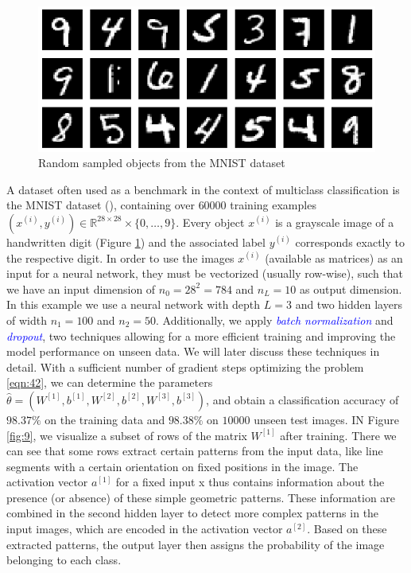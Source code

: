 \begin{figure}[h!]
    \centering
    \includegraphics[width=\textwidth]{images/figure8.png}
    \caption{Random sampled objects from the MNIST dataset}
    \label{fig:8}
\end{figure}

\begin{example}[MNIST]
A dataset often used as a benchmark in the context of multiclass classification is the MNIST dataset (\cite{lecun1998mnist, lecun1998gradient}), containing over $60000$ training examples $(x^{(i)}, y^{(i)}) \in \mathbb{R}^{28 \times 28} \times \{0, \ldots, 9\}$. Every object $x^{(i)}$ is a grayscale image of a handwritten digit (Figure \ref{fig:8}) and the associated label $y^{(i)}$ corresponds exactly to the respective digit. In order to use the images $x^{(i)}$ (available as matrices) as an input for a neural network, they must be
vectorized (usually row-wise), such that we have an input dimension of $n_0 = 28^2 = 784$ and $n_L = 10$ as output dimension. In this example we use a neural network with depth $L=3$ and two hidden layers of width $n_1 = 100$ and $n_2 = 50$. Additionally, we apply \textcolor{blue}{\emph{batch normalization}} and \textcolor{blue}{\emph{dropout}}, two techniques allowing for a more efficient training and improving the model
performance on unseen data. We will later discuss these techniques in detail. With a sufficient number of gradient steps optimizing the problem \ref{eqn:42}, we can determine the parameters $\hat{\theta} = (W^{[1]}, b^{[1]}, W^{[2]}, b^{[2]}, W^{[3]}, b^{[3]})$, and obtain a classification accuracy of $98.37\%$ on the training data and $98.38\%$ on $10000$ unseen test images. IN Figure \ref{fig:9}, we visualize a subset of rows of the matrix $W^{[1]}$ after training. There we can see that some rows extract certain patterns from the input data, like line segments with a certain orientation on fixed positions in the image. The activation vector $a^{[1]}$ for a fixed input x thus contains information about the presence (or absence) of these simple geometric patterns. These information are combined in the second hidden layer to detect more complex patterns in the input images, which are encoded in the activation vector $a^{[2]}$. Based on these extracted patterns, the output layer then assigns the probability of the image belonging to each class.
\end{example}

